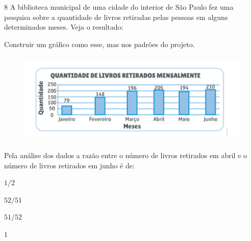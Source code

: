 

\num{8}  A biblioteca municipal de uma cidade do interior de São Paulo fez uma
pesquisa sobre a quantidade de livros retiradas pelas pessoas em alguns
determinados meses. Veja o resultado:

Construir um gráfico como esse, mas nos padrões do projeto.

\begin{figure}
\centering  \includegraphics[width=5in,height=1.71875in]{./imgSAEB_6_MAT/media/image117.png}
\end{figure}

Pela análise dos dados a razão entre o número de livros retirados em
abril e o número de livros retirados em junho é de:

\begin{escolha}
\item $1/2$
\item $52/51$
\item $51/52$
\item $1$
\end{escolha}


